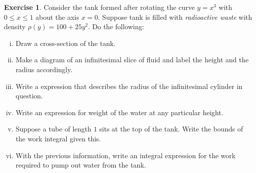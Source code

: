 \documentclass[12pt]{article}
\theoremstyle{plain}
\theoremstyle{definition}
\newtheorem{Ej}[Th]{Exercise}         %
\theoremstyle{remark}
\renewcommand{\leq}{\leqslant}      %
\renewcommand{\:}{\colon}           %
\renewcommand{\.}{\Cdot}                %
\begin{document}
\begin{Ej}
 Consider the tank formed after rotating the curve $y=x^3$ with $0\leq x\leq 1$ about the axis $x=0$. Suppose tank is filled with \emph{radioactive waste} with density $\rho(y)=100+25y^2$. Do the following:
 \begin{enumerate}[i)]
  \itemsep=-0.4em 
  \item Draw a cross-section of the tank.
  \item Make a diagram of an infinitesimal slice of fluid and label the height and the radius accordingly.
  \item Write a expression that describes the radius of the infinitesimal cylinder in question.
  \item Write an expression for weight of the water at any particular height. 
  \item Suppose a tube of length $1$ sits at the top of the tank. Write the bounds of the work integral given this.
  \item With the previous information, write an integral expression for the work required to pump out water from the tank.
 \end{enumerate}
\end{Ej}

\begin{ptcb}
  \vspace*{7cm} 
\end{ptcb}

\end{document}
